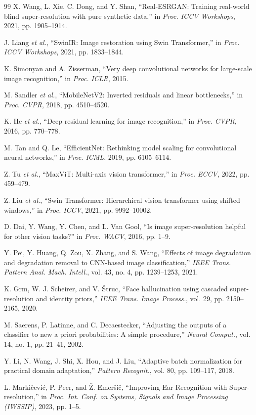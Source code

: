 \documentclass[conference]{IEEEtran}
\begin{document}
\begin{thebibliography}{99}
X. Wang, L. Xie, C. Dong, and Y. Shan, ``Real-ESRGAN: Training real-world blind super-resolution with pure synthetic data,'' in \emph{Proc. ICCV Workshops}, 2021, pp. 1905--1914.

J. Liang \emph{et al.}, ``SwinIR: Image restoration using Swin Transformer,'' in \emph{Proc. ICCV Workshops}, 2021, pp. 1833--1844.

K. Simonyan and A. Zisserman, ``Very deep convolutional networks for large-scale image recognition,'' in \emph{Proc. ICLR}, 2015.

M. Sandler \emph{et al.}, ``MobileNetV2: Inverted residuals and linear bottlenecks,'' in \emph{Proc. CVPR}, 2018, pp. 4510--4520.

K. He \emph{et al.}, ``Deep residual learning for image recognition,'' in \emph{Proc. CVPR}, 2016, pp. 770--778.

M. Tan and Q. Le, ``EfficientNet: Rethinking model scaling for convolutional neural networks,'' in \emph{Proc. ICML}, 2019, pp. 6105--6114.

Z. Tu \emph{et al.}, ``MaxViT: Multi-axis vision transformer,'' in \emph{Proc. ECCV}, 2022, pp. 459--479.

Z. Liu \emph{et al.}, ``Swin Transformer: Hierarchical vision transformer using shifted windows,'' in \emph{Proc. ICCV}, 2021, pp. 9992--10002.

D. Dai, Y. Wang, Y. Chen, and L. Van Gool, ``Is image super-resolution helpful for other vision tasks?'' in \emph{Proc. WACV}, 2016, pp. 1--9.

Y. Pei, Y. Huang, Q. Zou, X. Zhang, and S. Wang, ``Effects of image degradation and degradation removal to CNN-based image classification,'' \emph{IEEE Trans. Pattern Anal. Mach. Intell.}, vol. 43, no. 4, pp. 1239--1253, 2021.

K. Grm, W. J. Scheirer, and V. \v{S}truc, ``Face hallucination using cascaded super-resolution and identity priors,'' \emph{IEEE Trans. Image Process.}, vol. 29, pp. 2150--2165, 2020.

M. Saerens, P. Latinne, and C. Decaestecker, ``Adjusting the outputs of a classifier to new a priori probabilities: A simple procedure,'' \emph{Neural Comput.}, vol. 14, no. 1, pp. 21--41, 2002.

Y. Li, N. Wang, J. Shi, X. Hou, and J. Liu, ``Adaptive batch normalization for practical domain adaptation,'' \emph{Pattern Recognit.}, vol. 80, pp. 109--117, 2018.

L. Marki\v{c}evi\'{c}, P. Peer, and \v{Z}. Emer\v{s}i\v{c}, ``Improving Ear Recognition with Super-resolution,'' in \emph{Proc. Int. Conf. on Systems, Signals and Image Processing (IWSSIP)}, 2023, pp. 1--5.

\end{thebibliography}
\end{document}
